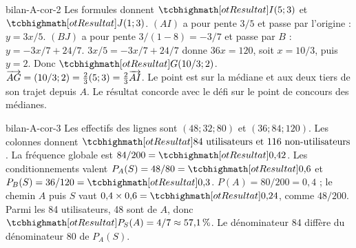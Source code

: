 \begin{blocEdition}{bilan-A-cor-2}
Les formules donnent $\res{I(5;3)}$ et $\res{J(1;3)}$.
$(AI)$ a pour pente $3/5$ et passe par l’origine : $y=3x/5$. $(BJ)$ a pour pente $3/(1-8)=-3/7$ et passe par $B$ : $y=-3x/7+24/7$.
$3x/5=-3x/7+24/7$ donne $36x=120$, soit $x=10/3$, puis $y=2$. Donc $\res{G(10/3;2)}$.
$\overrightarrow{AG}=(10/3;2)=\tfrac23(5;3)=\tfrac23\overrightarrow{AI}$. Le point est sur la médiane et aux deux tiers de son trajet depuis $A$. Le résultat concorde avec le défi sur le point de concours des médianes.
\label{fig-bilan-A-cor-2}

\end{blocEdition}
\begin{blocEdition}{bilan-A-cor-3}
Les effectifs des lignes sont $(48;32;80)$ et $(36;84;120)$. Les colonnes donnent $\res{84\text{ utilisateurs et }116\text{ non-utilisateurs}}$.
La fréquence globale est $84/200=\res{0{,}42}$. Les conditionnements valent $P_A(S)=48/80=\res{0{,}6}$ et $P_B(S)=36/120=\res{0{,}3}$.
$P(A)=80/200=0{,}4$ ; le chemin $A$ puis $S$ vaut $0{,}4\times0{,}6=\res{0{,}24}$, comme $48/200$.
Parmi les 84 utilisateurs, 48 sont de $A$, donc $\res{P_S(A)=4/7\approx57{,}1\,\%}$. Le dénominateur 84 diffère du dénominateur 80 de $P_A(S)$.
\label{fig-bilan-A-cor-3}

\end{blocEdition}
